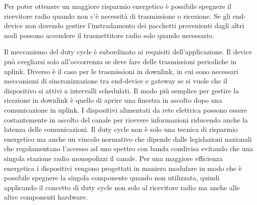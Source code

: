 \documentclass[12pt,a4paper,openright,twoside]{report}
\begin{document}
Per poter ottenere un maggiore risparmio energetico \`e possibile spegnere il ricevitore radio quando non c'\`e necessit\`a di trasmissione o ricezione. 
Se gli end-device non dovendo gestire l'instradamento dei pacchetti provenienti dagli altri nodi possono accendere il trasmettitore radio solo quando necessario. 


Il meccanismo del duty cycle \`e subordinato ai requisiti dell'applicazione. 
Il device pu\`o svegliarsi solo all'occorrenza se deve fare delle trasmissioni periodiche in uplink. 
Diverso \`e il caso per le trasmissioni in downlink, in cui sono necessari meccanismi di sincronizzazione tra end-device e gateway se si vuole che il dispositivo si attivi a intervalli schedulati. 
Il modo pi\`u semplice per gestire la ricezione in downlink \`e quello di aprire una finestra in ascolto dopo una comunicazione in uplink.
I dispositivi alimentati da rete elettrica possono essere costantemente in ascolto del canale per ricevere informazioni riducendo anche la latenza delle comunicazioni. 
Il duty cycle non \`e solo una tecnica di risparmio energetico ma anche un vincolo normativo che dipende dalle legislazioni nazionali che regolamentano l'accesso ad uno spettro con banda condivisa evitando che una singola stazione radio monopolizzi il canale.
Per una maggiore efficienza energetica i dispositivi vengono progettati in maniera modulare in modo che \`e possibile spegnere la singola componente quando non utilizzata, quindi applicando il concetto di duty cycle non solo al ricevitore radio ma anche alle altre componenti hardware.
\end{document}
